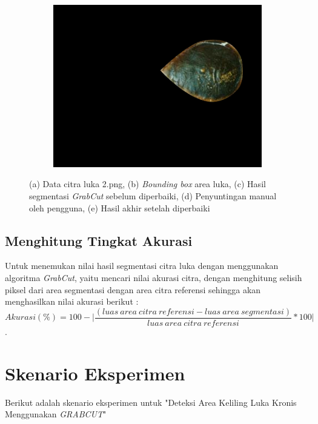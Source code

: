 \begin{figure}[H]
\begin{subfigure}{0.3\textwidth}
		\includegraphics[width=\textwidth]{gambar/res_2.png}
		\caption{}
	  \end{subfigure}
	\caption{
		(a) Data citra luka 2.png, (b) \emph{Bounding box} area luka, (c) Hasil 
        segmentasi \emph{GrabCut} sebelum diperbaiki, (d) Penyuntingan manual oleh pengguna, (e) Hasil akhir setelah diperbaiki
	 }
  \end{figure}

\subsection{Menghitung Tingkat Akurasi}
Untuk menemukan nilai hasil segmentasi citra luka dengan menggunakan algoritma \emph{GrabCut},
yaitu mencari nilai akurasi citra, dengan menghitung selisih piksel dari area
segmentasi dengan area citra referensi sehingga akan menghasilkan nilai akurasi berikut :
\begin{equation} \label{eq:validasi}
	Akurasi(\%) = 100 - \bigg | \frac{(luas \: area \: citra \: referensi - luas \: area \: segmentasi)}{luas \: area \: citra \: referensi} * 100 \bigg |
\end{equation}.


\section{Skenario Eksperimen} \label{section:skenario_eksperimen}

Berikut adalah skenario eksperimen untuk "Deteksi Area Keliling Luka Kronis 
Menggunakan \emph{GRABCUT}"

